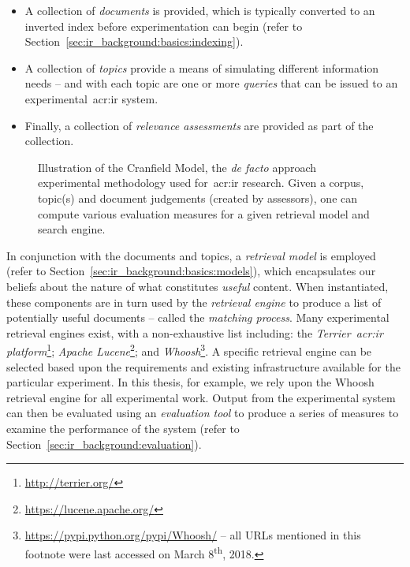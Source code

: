 \begin{itemize}
    \item{A collection of \emph{documents} is provided, which is typically converted to an inverted index before experimentation can begin (refer to Section~\ref{sec:ir_background:basics:indexing}).}
    \item{A collection of \emph{topics} provide a means of simulating different information needs -- and with each topic are one or more \emph{queries} that can be issued to an experimental~\gls{acr:ir} system.}
    \item{Finally, a collection of \emph{relevance assessments} are provided as part of the collection.}
\end{itemize}

\begin{figure}[t!]
    \centering
    \caption[The \emph{Cranfield Model}]{Illustration of the Cranfield Model, the \emph{de facto} approach experimental methodology used for~\gls{acr:ir} research. Given a corpus, topic(s) and document judgements (created by assessors), one can compute various evaluation measures for a given retrieval model and search engine.}
    \label{fig:ir_cranfield}
\end{figure}

In conjunction with the documents and topics, a \emph{retrieval model} is employed (refer to Section~\ref{sec:ir_background:basics:models}), which encapsulates our beliefs about the nature of what constitutes \emph{useful} content. When instantiated, these components are in turn used by the \emph{retrieval engine} to produce a list of potentially useful documents -- called the \emph{matching process}. Many experimental retrieval engines exist, with a non-exhaustive list including: the \emph{Terrier~\gls{acr:ir} platform}\footnote{\url{http://terrier.org/}}; \emph{Apache Lucene}\footnote{\url{https://lucene.apache.org/}}; and \emph{Whoosh}\footnote{\url{https://pypi.python.org/pypi/Whoosh/} -- all URLs mentioned in this footnote were last accessed on March 8\textsuperscript{th}, 2018. }. A specific retrieval engine can be selected based upon the requirements and existing infrastructure available for the particular experiment. In this thesis, for example, we rely upon the Whoosh retrieval engine for all experimental work. Output from the experimental system can then be evaluated using an \emph{evaluation tool} to produce a series of measures to examine the performance of the system (refer to Section~\ref{sec:ir_background:evaluation}).

